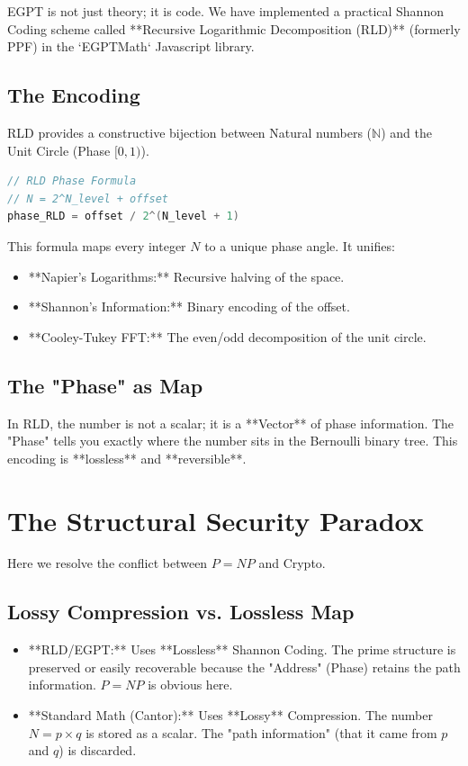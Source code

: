 \documentclass[11pt, a4paper]{article}
\begin{document}
EGPT is not just theory; it is code. We have implemented a practical Shannon Coding scheme called **Recursive Logarithmic Decomposition (RLD)** (formerly PPF) in the `EGPTMath` Javascript library.

\subsection{The Encoding}
RLD provides a constructive bijection between Natural numbers ($\mathbb{N}$) and the Unit Circle (Phase $[0, 1)$).
\begin{lstlisting}[language=C, caption={RLD Canonical Formula}]
// RLD Phase Formula
// N = 2^N_level + offset
phase_RLD = offset / 2^(N_level + 1)
\end{lstlisting}
This formula maps every integer $N$ to a unique phase angle. It unifies:
\begin{itemize}
    \item **Napier's Logarithms:** Recursive halving of the space.
    \item **Shannon's Information:** Binary encoding of the offset.
    \item **Cooley-Tukey FFT:** The even/odd decomposition of the unit circle.
\end{itemize}

\subsection{The "Phase" as Map}
In RLD, the number is not a scalar; it is a **Vector** of phase information. The "Phase" tells you exactly where the number sits in the Bernoulli binary tree. This encoding is **lossless** and **reversible**.

\section{The Structural Security Paradox}

Here we resolve the conflict between $P=NP$ and Crypto.

\subsection{Lossy Compression vs. Lossless Map}
\begin{itemize}
    \item **RLD/EGPT:** Uses **Lossless** Shannon Coding. The prime structure is preserved or easily recoverable because the "Address" (Phase) retains the path information. $P=NP$ is obvious here.
    \item **Standard Math (Cantor):** Uses **Lossy** Compression. The number $N = p \times q$ is stored as a scalar. The "path information" (that it came from $p$ and $q$) is discarded.
\end{itemize}
\end{document}
